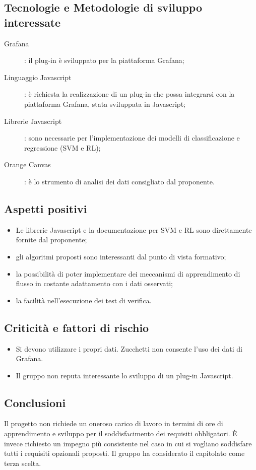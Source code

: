 \documentclass[../studio-di-fattibilita.tex]{subfiles}
\begin{document}
  \subsection{Tecnologie e Metodologie di sviluppo interessate}%
  \label{subsec:tecnologie_interessate}
  \begin{description}
    \item [Grafana]: il plug-in è sviluppato per la piattaforma Grafana;
    \item [Linguaggio Javascript]: è richiesta la realizzazione di un plug-in che possa integrarsi con la piattaforma Grafana, stata sviluppata in Javascript;
    \item [Librerie Javascript]: sono necessarie per l'implementazione dei modelli di classificazione e regressione (SVM e RL);
    \item [Orange Canvas]: è lo strumento di analisi dei dati consigliato dal proponente.
  \end{description}


  \subsection{Aspetti positivi}%
  \label{subsec:aspetti_positivi}
  \begin{itemize}
    \item Le librerie Javascript e la documentazione per SVM e RL sono direttamente fornite dal proponente;
    \item gli algoritmi proposti sono interessanti dal punto di vista formativo;
    \item la possibilità di poter implementare dei meccanismi di apprendimento di flusso in costante adattamento con i dati osservati;
    \item la facilità nell'esecuzione dei test di verifica.
  \end{itemize}


  \subsection{Criticità e fattori di rischio}%
  \label{subsec:criticita_e_fattori_di_rischio}
  \begin{itemize}
    \item Si devono utilizzare i propri dati. Zucchetti non consente l'uso dei dati di Grafana.
    \item Il gruppo non reputa interessante lo sviluppo di un plug-in Javascript.
  \end{itemize}


  \subsection{Conclusioni}%
  \label{subsec:conclusioni}
  Il progetto non richiede un oneroso carico di lavoro in termini di ore di apprendimento e sviluppo per il soddisfacimento dei requisiti obbligatori. È invece richiesto un impegno più consistente nel caso in cui si vogliano soddisfare tutti i requisiti opzionali proposti.
  Il gruppo ha considerato il capitolato come terza scelta.
\end{document}
